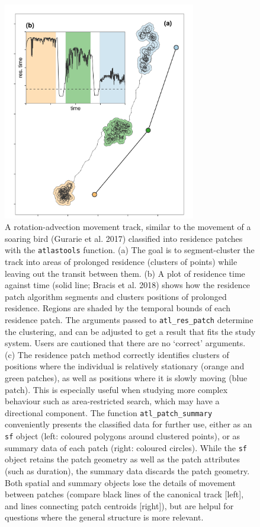\documentclass[10pt,paper=a4,headings=standardclasses
]{scrartcl}
\begin{document}
\begin{figure}[h!]
    \centering
    \includegraphics[width=0.75\textwidth]{figures/fig_05_residence.png}
    \caption{A rotation-advection movement track, similar to the movement of a soaring bird (Gurarie et al. 2017) classified into residence patches with the \texttt{atlastools} function.
    (a) The goal is to segment-cluster the track into areas of prolonged residence (clusters of points) while leaving out the transit between them.
    (b) A plot of residence time against time (solid line; Bracis et al. 2018) shows how the residence patch algorithm segments and clusters positions of prolonged residence. 
    Regions are shaded by the temporal bounds of each residence patch.
    The arguments passed to \texttt{atl\_res\_patch} determine the clustering, and can be adjusted to get a result that fits the study system.
    Users are cautioned that there are no `correct' arguments.
    (c) The residence patch method correctly identifies clusters of positions where the individual is relatively stationary (orange and green patches), as well as positions where it is slowly moving (blue patch).
    This is especially useful when studying more complex behaviour such as area-restricted search, which may have a directional component.
    The function \texttt{atl\_patch\_summary} conveniently presents the classified data for further use, either as an \texttt{sf} object (left: coloured polygons around clustered points), or as summary data of each patch (right: coloured circles).
    While the \texttt{sf} object retains the patch geometry as well as the patch attributes (such as duration), the summary data discards the patch geometry.
    Both spatial and summary objects lose the details of movement between patches (compare black lines of the canonical track [left], and lines connecting patch centroids [right]), but are helpul for questions where the general structure is more relevant.}
    \label{fig:figure_residence_patch}
\end{figure}
\end{document}
